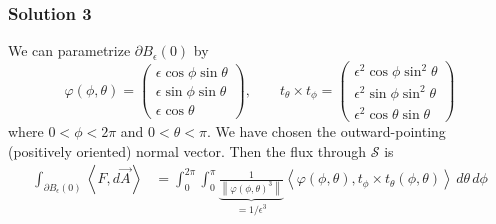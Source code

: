 \documentclass[10pt, t, allowdisplaybreaks]{beamer}
\begin{document}
\begin{frame}
    \frametitle{Solution 3}
    \par  We can parametrize $\partial B_\epsilon(0)$ by 
    \begin{equation*}
        \varphi(\phi, \theta) = \begin{pmatrix}
            \epsilon \cos \phi \sin \theta\\
            \epsilon \sin\phi \sin\theta\\
            \epsilon\cos\theta
        \end{pmatrix}, \qquad
        t_\theta\times t_\phi = \begin{pmatrix}
            \epsilon^2\cos\phi\sin^2\theta\\
            \epsilon^2\sin\phi\sin^2\theta\\
            \epsilon^2\cos\theta\sin\theta
        \end{pmatrix}
    \end{equation*}
    where $0<\phi<2\pi$ and $0<\theta<\pi$. We have chosen the outward-pointing (positively oriented) normal vector. Then the flux through $\mathcal{S}$ is 
    \begin{equation*}
        \begin{split}
            \int_{\partial B_\epsilon(0)}\left\langle F, d\overrightarrow{A} \right\rangle 
            &= \int^{2\pi}_0\int^\pi_0\underbrace{\frac{1}{\left\lVert \varphi(\phi,\theta)^3\right\rVert }}_{=1/\epsilon^3}\left\langle \varphi(\phi, \theta), t_\phi\times t_\theta(\phi, \theta)\right\rangle \,d\theta\,d\phi\\
        \end{split}
    \end{equation*}
\end{frame}
\end{document}
